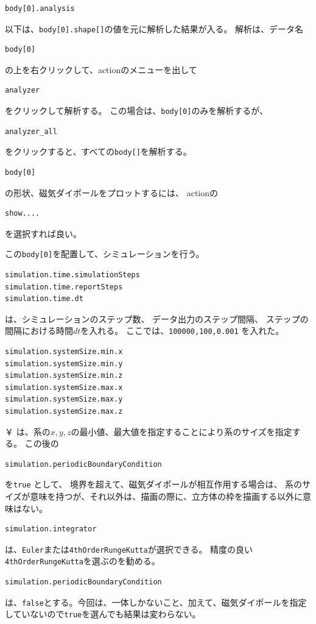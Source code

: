 \documentclass[a4paper,11pt]{jarticle}
\begin{document}
\begin{verbatim}
body[0].analysis
\end{verbatim}
以下は、\verb|body[0].shape[]|の値を元に解析した結果が入る。
解析は、データ名
\begin{verbatim}
body[0]
\end{verbatim}
の上を右クリックして、actionのメニューを出して
\begin{verbatim}
analyzer
\end{verbatim}
をクリックして解析する。
この場合は、\verb|body[0]|のみを解析するが、
\begin{verbatim}
analyzer_all
\end{verbatim}
をクリックすると、すべての\verb|body[]|を解析する。

\begin{verbatim}
body[0]
\end{verbatim}
の形状、磁気ダイポールをプロットするには、
actionの
\begin{verbatim}
show....
\end{verbatim}
を選択すれば良い。

この\verb|body[0]|を配置して、シミュレーションを行う。
\begin{verbatim}
simulation.time.simulationSteps
simulation.time.reportSteps
simulation.time.dt
\end{verbatim}
は、シミュレーションのステップ数、
データ出力のステップ間隔、
ステップの間隔における時間$dt$を入れる。
ここでは、\verb|100000,100,0.001|
を入れた。
\begin{verbatim}
simulation.systemSize.min.x
simulation.systemSize.min.y
simulation.systemSize.min.z
simulation.systemSize.max.x
simulation.systemSize.max.y
simulation.systemSize.max.z
\end{verbatim}￥
は、系の$x,y,z$の最小値、最大値を指定することにより系のサイズを指定する。
この後の
\begin{verbatim}
simulation.periodicBoundaryCondition
\end{verbatim}
を\verb|true|
として、
境界を超えて、磁気ダイポールが相互作用する場合は、
系のサイズが意味を持つが、それ以外は、描画の際に、立方体の枠を描画する以外に意味はない。
\begin{verbatim}
simulation.integrator
\end{verbatim}
は、\verb|Euler|または\verb|4thOrderRungeKutta|が選択できる。
精度の良い\verb|4thOrderRungeKutta|を選ぶのを勧める。
\begin{verbatim}
simulation.periodicBoundaryCondition
\end{verbatim}
は、\verb|false|とする。今回は、一体しかないこと、加えて、磁気ダイポールを指定していないので\verb|true|を選んでも結果は変わらない。
\end{document}
